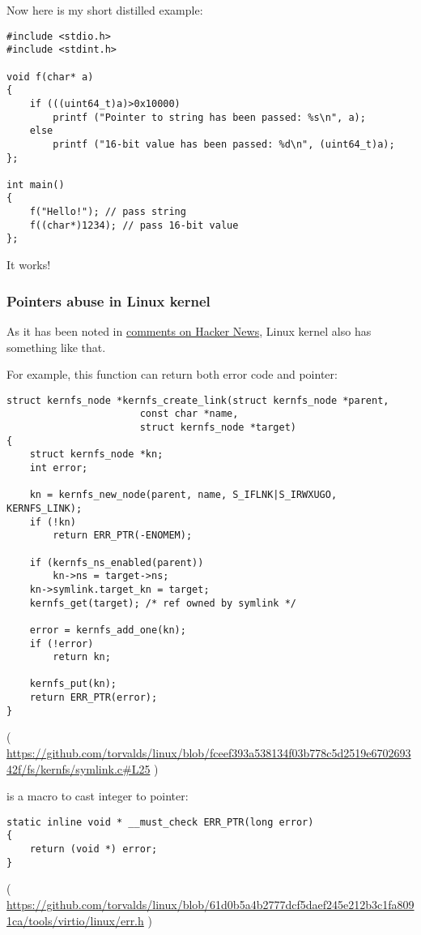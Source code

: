 Now here is my short distilled example:

\begin{lstlisting}[style=customc]
#include <stdio.h>
#include <stdint.h>

void f(char* a)
{
	if (((uint64_t)a)>0x10000)
		printf ("Pointer to string has been passed: %s\n", a);
	else
		printf ("16-bit value has been passed: %d\n", (uint64_t)a);
};

int main()
{
	f("Hello!"); // pass string
	f((char*)1234); // pass 16-bit value
};
\end{lstlisting}

It works!

\subsubsection{Pointers abuse in Linux kernel}

As it has been noted in \href{https://news.ycombinator.com/item?id=11823647}{comments on Hacker News}, Linux kernel also has something like that.

For example, this function can return both error code and pointer:

\begin{lstlisting}[style=customc]
struct kernfs_node *kernfs_create_link(struct kernfs_node *parent,
				       const char *name,
				       struct kernfs_node *target)
{
	struct kernfs_node *kn;
	int error;

	kn = kernfs_new_node(parent, name, S_IFLNK|S_IRWXUGO, KERNFS_LINK);
	if (!kn)
		return ERR_PTR(-ENOMEM);

	if (kernfs_ns_enabled(parent))
		kn->ns = target->ns;
	kn->symlink.target_kn = target;
	kernfs_get(target);	/* ref owned by symlink */

	error = kernfs_add_one(kn);
	if (!error)
		return kn;

	kernfs_put(kn);
	return ERR_PTR(error);
}
\end{lstlisting}

( \url{https://github.com/torvalds/linux/blob/fceef393a538134f03b778c5d2519e670269342f/fs/kernfs/symlink.c#L25} )

 is a macro to cast integer to pointer:

\begin{lstlisting}[style=customc]
static inline void * __must_check ERR_PTR(long error)
{
	return (void *) error;
}
\end{lstlisting}

( \url{https://github.com/torvalds/linux/blob/61d0b5a4b2777dcf5daef245e212b3c1fa8091ca/tools/virtio/linux/err.h} )

